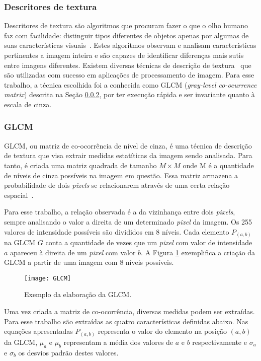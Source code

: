 \subsubsection{Descritores de textura}\label{sec:descritores}

Descritores de textura são algoritmos que procuram fazer o que o olho humano faz com facilidade: distinguir tipos diferentes de objetos apenas por algumas de suas características visuais~\cite{GLCM}. Estes algoritmos observam e analisam características pertinentes a imagem inteira e são capazes de identificar diferenças mais sutis entre imagens diferentes. Existem diversas técnicas de descrição de textura~\cite{ojala2002multiresolution} que são utilizadas com sucesso em aplicações de processamento de imagem. Para esse trabalho, a técnica escolhida foi a conhecida como GLCM (\textit{gray-level co-ocurrence matrix}) descrita na Seção \ref{sec:GLCM}, por ter execução rápida e ser invariante quanto à escala de cinza.

\subsubsection{GLCM}\label{sec:GLCM}

GLCM, ou matriz de co-ocorrência de nível de cinza, é uma técnica de descrição de textura que visa extrair medidas estatíticas da imagem sendo analisada. Para tanto, é criada uma matriz quadrada de tamanho $M\times M$ onde M é a quantidade de níveis de cinza possíveis na imagem em questão. Essa matriz armazena a probabilidade de dois \textit{pixels} se relacionarem através de uma certa relação espacial~\cite{GLCM}. 

Para esse trabalho, a relação observada é a da vizinhança entre dois \textit{pixels}, sempre analisando o valor a direita de um determinado \textit{pixel} da imagem. Os 255 valores de intensidade possíveis são divididos em 8 níveis. Cada elemento $P_{(a,b)}$ na GLCM $G$ conta a quantidade de vezes que um \textit{pixel} com valor de intensidade  $a$ apareceu à direita de um \textit{pixel} com valor $b$. A Figura \ref{fig:GLCM} exemplifica a criação da GLCM a partir de uma imagem com 8 níveis possíveis.

\begin{figure}
\texttt{[image: GLCM]} 
\centering
\caption[Exemplo da elaboração da GLCM]{Exemplo da elaboração da GLCM\protect\footnotemark.}
\label{fig:GLCM}
\centering
\end{figure}
Uma vez criada a matriz de co-ocorrência, diversas medidas podem ser extraídas. Para esse trabalho são extraídas as quatro características definidas abaixo. Nas equações apresentadas $P_{(a,b)}$ representa o valor do elemento na posição $(a,b)$ da GLCM, $\mu_a$ e $\mu_b$ representam a média dos valores de $a$ e $b$ respectivamente e $\sigma_a$ e $\sigma_b$ os desvios padrão destes valores.

